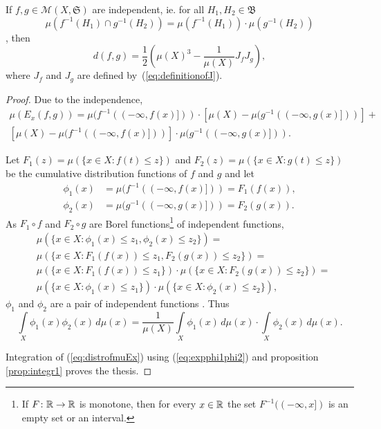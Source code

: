 \begin{prop}
  If $f, g \in \mathcal{M}(X, \mathfrak{S})$ are independent, ie. for
  all $H_1, H_2 \in \mathfrak{B}$ \[ \mu(f^{-1}(H_1) \cap g^{-1}(H_2))
  = \mu(f^{-1}(H_1)) \cdot \mu(g^{-1}(H_2)) \] \cite
  [chapter~4.20,~p.~260] {billingsley-2009}, then \[ d(f, g) =
  \frac{1}{2} \left(\mu(X)^3 - \frac{1}{\mu(X)} J_fJ_g \right), \]
  where $J_f$ and $J_g$ are defined by~(\ref{eq:definitionofJ}).
\end{prop}

\begin{proof}
  Due to the independence,
  \begin{multline} \label{eq:distrofmuEx}
    \mu(E_x(f, g)) = \mu(f^{-1}((-\infty, f(x)])) \cdot \left[ \mu(X)
        - \mu(g^{-1}((-\infty, g(x)])) \right] + \\
        \left[ \mu(X) - \mu(f^{-1}((-\infty, f(x)])) \right] \cdot
          \mu(g^{-1}((-\infty, g(x)])).
  \end{multline}

  Let $F_1(z) = \mu(\{ x \in X \colon f(t) \leq z \})$ and $F_2(z) =
  \mu(\{ x \in X \colon g(t) \leq z \})$ be the cumulative
  distribution functions of $f$ and $g$ and let
  \begin{align*}
    \phi_1(x) &= \mu(f^{-1}((-\infty, f(x)])) = F_1(f(x)), \\
    \phi_2(x) &= \mu(g^{-1}((-\infty, g(x)])) = F_2(g(x)).
  \end{align*}
  As $F_1 \circ f$ and $F_2 \circ g$ are Borel functions\footnote{If
    $F \colon \mathbb{R} \to \mathbb{R}$ is monotone, then for every $x \in
    \mathbb{R}$ the set $F^{-1}((-\infty, x])$ is an empty set or an
  interval.} of independent functions, \[ \begin{split}
    &\mu(\{ x \in X \colon \phi_1(x) \leq z_1, \phi_2(x) \leq z_2 \}) = \\
    &\mu(\{ x \in X \colon F_1(f(x)) \leq z_1, F_2(g(x)) \leq z_2 \}) = \\
    &\mu(\{ x \in X \colon F_1(f(x)) \leq z_1 \}) \cdot
    \mu(\{ x \in X \colon F_2(g(x)) \leq z_2 \}) = \\
    &\mu(\{ x \in X \colon \phi_1(x) \leq z_1 \}) \cdot
    \mu(\{ x \in X \colon \phi_2(x) \leq z_2 \}), \end{split} \]
  $\phi_1$ and $\phi_2$ are a pair of independent functions \cite
  [theorem~14, p.~101] {jakubowski-sztencel-2001}.
  Thus \cite [chapter~4.21,~p.~277] {billingsley-2009}
  \begin{equation} \label{eq:expphi1phi2}
    \int \limits_X \phi_1(x) \phi_2(x) \, d\mu(x) = \frac{1}{\mu(X)}
    \int \limits_X \phi_1(x) \, d\mu(x) \cdot \int \limits_X \phi_2(x)
    \, d\mu(x).
  \end{equation}

  Integration of (\ref{eq:distrofmuEx}) using (\ref{eq:expphi1phi2})
  and proposition \ref{prop:integr1} proves the thesis.
\end{proof}

